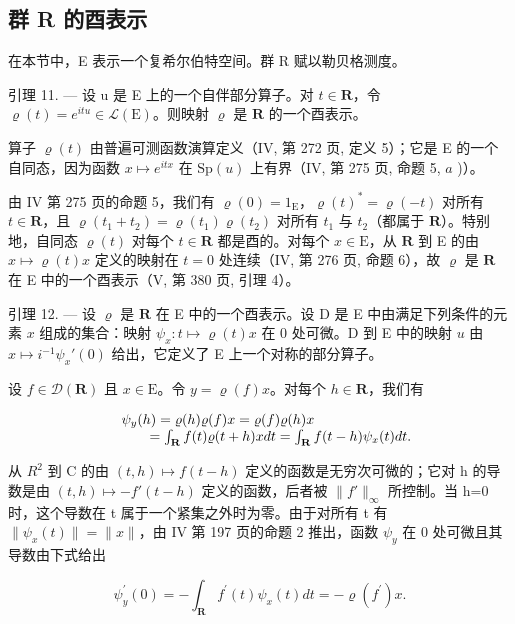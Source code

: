\subsection{群 R 的酉表示}

在本节中，E 表示一个复希尔伯特空间。群 R 赋以勒贝格测度。

引理 11. --- 设 u 是 E 上的一个自伴部分算子。对 \(t \in \mathbf{R}\)，令 \(\varrho(t) = e^{itu} \in \mathcal{L}(\mathrm{E})\)。则映射 \(\varrho\) 是 \(\mathbf{R}\) 的一个酉表示。

算子 \(\varrho(t)\) 由普遍可测函数演算定义（IV, 第 272 页, 定义 5）；它是 E 的一个自同态，因为函数 \(x \mapsto e^{itx}\) 在 \(\mathrm{Sp}(u)\) 上有界（IV, 第 275 页, 命题 5, \(a\) )）。

由 IV 第 275 页的命题 5，我们有 \(\varrho(0) = 1_{\mathrm{E}}\)，\(\varrho(t)^* = \varrho(-t)\) 对所有 \(t \in \mathbf{R}\)，且 \(\varrho(t_1 + t_2) = \varrho(t_1)\varrho(t_2)\) 对所有 \(t_1\) 与 \(t_2\)（都属于 \(\mathbf{R}\)）。特别地，自同态 \(\varrho(t)\) 对每个 \(t \in \mathbf{R}\) 都是酉的。对每个 \(x \in \mathrm{E}\)，从 \(\mathbf{R}\) 到 E 的由 \(x \mapsto \varrho(t)x\) 定义的映射在 \(t = 0\) 处连续（IV, 第 276 页, 命题 6），故 \(\varrho\) 是 \(\mathbf{R}\) 在 E 中的一个酉表示（V, 第 380 页, 引理 4）。

引理 12. --- 设 \(\varrho\) 是 \(\mathbf{R}\) 在 E 中的一个酉表示。设 D 是 E 中由满足下列条件的元素 \(x\) 组成的集合：映射 \(\psi_x: t \mapsto \varrho(t)x\) 在 0 处可微。D 到 E 中的映射 \(u\) 由 \(x \mapsto i^{-1} \psi_x'(0)\) 给出，它定义了 E 上一个对称的部分算子。

设 \(f \in \mathcal{D}(\mathbf{R})\) 且 \(x \in \mathrm{E}\)。令 \(y = \varrho(f)x\)。对每个 \(h \in \mathbf{R}\)，我们有

\[
\begin{array}{r l} & {\psi_ {y} (h) = \varrho (h) \varrho (f) x = \varrho (f) \varrho (h) x} \\ & {\qquad = \int_ {\mathbf {R}} f (t) \varrho (t + h) x d t = \int_ {\mathbf {R}} f (t - h) \psi_ {x} (t) d t.} \end{array}
\]

从 \(R^{2}\) 到 C 的由 \((t,h)\mapsto f(t-h)\) 定义的函数是无穷次可微的；它对 h 的导数是由 \((t,h)\mapsto -f'(t-h)\) 定义的函数，后者被 \(\|f'\|_{\infty}\) 所控制。当 h=0 时，这个导数在 t 属于一个紧集之外时为零。由于对所有 t 有 \(\|\psi_{x}(t)\|=\|x\|\)，由 IV 第 197 页的命题 2 推出，函数 \(\psi_{y}\) 在 0 处可微且其导数由下式给出

\[
\psi_ {y} ^ {\prime} (0) = - \int_ {\mathbf {R}} f ^ {\prime} (t) \psi_ {x} (t) d t = - \varrho (f ^ {\prime}) x.
\]

